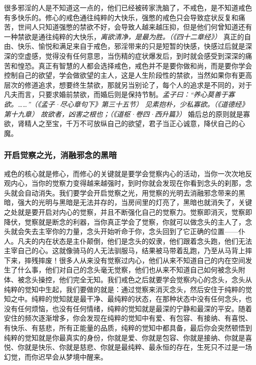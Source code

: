 很多邪淫的人是不知道这一点的，他们已经被砖家洗脑了，不戒色，是不知道戒色有多快乐的。修心的戒色通往纯粹的大快乐，强憋的戒色只会导致症状反复和痛苦，世间人只知道强憋的禁欲不好，会导致人越来越压抑，但是他们何曾知道还有一种禁欲是通往纯粹的大快乐，\textit{离欲清净，是最为胜。（《四十二章经》）} 真正的自由、快乐、愉悦和满足来自于戒色，邪淫带来的只是短暂的快感，快感过后就是深深的空虚感，觉得没有任何意思，当伤精的症状爆发后，到时就会感受到深深的痛苦和惶恐。真正有智慧的人都会选择戒色，戒色并不是要你做和尚，而是要你学会控制自己的欲望，学会做欲望的主人，这是人生阶段性的禁欲，当然如果你有更高层次的修道追求，想要终生禁欲，那就另当别论了，每个人的追求是不同的，对于凡夫而言，只要求婚前禁欲，而婚后则是保持节制。\textit{孟子曰：“养心莫善于寡欲。……”（《孟子·尽心章句下》第三十五节）} \textit{见素抱朴，少私寡欲。（《道德经》第十九章）} \textit{故欲者，凶害之根也；（《道枢·卷四·西升篇》）} 婚后总的原则就是寡欲，肾精人之至宝，千万不可放纵自己的欲望，君子当正心诚意，降伏自己的心魔。

\subsubsection{开启觉察之光，消融邪念的黑暗}

戒色的核心就是修心，而修心的关键就是要学会觉察内心的活动，当你一次次地反观内心，当你的觉察力变得越来越强时，到时你就会发现在你看到念头的刹那，念头就会自动消失。我们要学会开启觉察之光，用觉察的光明去消融邪念带来的黑暗，强大的光明与黑暗是无法并存的，当房间里的灯亮了，黑暗也就消失了，关键之处就是要开启对内心的觉察，并且不断强化自己的觉察力。觉察即消灭，觉察即降伏，觉察就是断念的利器，当你真正学会了觉察，你就可以做念头的主人了，念头就会失去主宰你的力量，念头开始听命于你，念头回到了它正确的位置——仆人。凡夫的内在状态是主仆颠倒，他们是念头的奴隶，他们跟着念头跑，他们无法主宰自己的心。这就像骑马的人无法驯服马，结果被马带着乱跑，乃至从马背上摔下来，摔残摔废！很多人从来没有觉察过内心，他们从来不知道自己的内在空间发生了什么事，他们对自己的念头毫无觉察，他们也从来不知道自己如何被念头附体、被念头操控，他们完全无知。我们戒色之后就要学会觉察内心的念头，念头从纯粹的觉知中生起，我们要做的就是：通过觉察来消灭念头，然后安住于纯粹的觉知之中。纯粹的觉知就是最干净、最纯粹的状态，在那种状态中没有任何念头，也没有任何烦恼，也没有任何情绪，纯粹的觉知就是最深的宁静和最深的平安。随着安住的频次逐渐增多，你会发现在纯粹的觉知中有爱、有包容、有接纳、有喜悦、有快乐、有慈悲，所有正能量的品质，纯粹的觉知中都具备，最后你会突然顿悟到纯粹的觉知就是你最真实的身份，你就是爱、你就是包容、你就是接纳、你就是喜悦、你就是快乐、你就是慈悲、你就是最纯粹、最永恒的存在，生死只不过是一场幻觉，而你迟早会从梦境中醒来。

